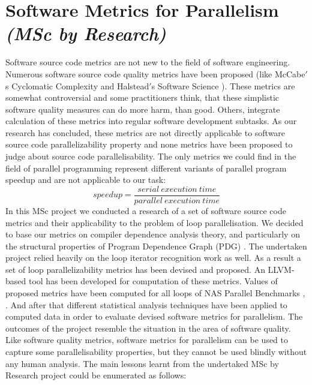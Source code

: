 \documentclass[12pt, a4paper]{article}
\begin{document}
\section*{\centering Software Metrics for Parallelism\\
	{\footnotesize \textit{(MSc by Research)}}}
\qquad Software source code metrics are not new to the field of software engineering. Numerous software source code quality metrics have been proposed (like McCabe$'$s Cyclomatic Complexity \cite{cyclomatic-complexity-paper} and Halstead$'$s Software Science \cite{halstead-book}). These metrics are somewhat controversial and some practitioners think, that these simplistic software quality measures can do more harm, than good. Others, integrate calculation of these metrics into regular software development subtasks.
As our research has concluded, these metrics are not directly applicable to software source code parallelizability property and none metrics have been proposed to judge about source code parallelisability. The only metrics we could find in the field of parallel programming represent different variants of parallel program speedup and are not applicable to our task:\newline
\begin{equation}
speedup=\frac{serial\ execution\ time}{parallel\ execution\ time}
\end{equation}\newline
\null\qquad In this MSc project we conducted a research of a set of software source code metrics and their applicability to the problem of loop parallelisation. We decided to base our metrics on compiler dependence analysis theory, and particularly on the structural properties of Program Dependence Graph (PDG) \cite{pdg-paper}. The undertaken project relied heavily on the loop iterator recognition work \cite{iterator-recognition-paper} as well.\newline
\null\qquad As a result a set of loop parallelizability metrics has been devised and proposed. An LLVM-based tool has been developed for computation of these metrics. Values of proposed metrics have been computed for all loops of NAS Parallel Benchmarks \cite{nas-official-website}, \cite{snu-nas-website}. And after that different statistical analysis techniques have been applied to computed data in order to evaluate devised software metrics for parallelism.\newline
\null\qquad The outcomes of the project resemble the situation in the area of software quality. Like software quality metrics, software metrics for parallelism can be used to capture some parallelisability properties, but they cannot be used blindly without any human analysis. The main lessons learnt from the undertaked MSc by Research project could be enumerated as follows:
\end{document}

